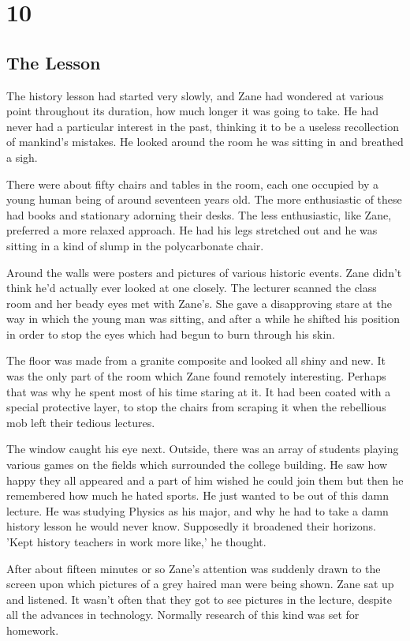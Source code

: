 \chapter{10}
\section{The Lesson}


The history lesson had started very slowly, and Zane had wondered at various point throughout its duration, how much longer it was going to take.  He had never had a particular interest in the past, thinking it to be a useless recollection of mankind's mistakes.   He looked around the room he was sitting in and breathed a sigh.

There were about fifty chairs and tables in the room, each one occupied by a young human being of around seventeen years old.  The more enthusiastic of these had books and stationary adorning their desks.  The less enthusiastic, like Zane, preferred a more relaxed approach.  He had his legs stretched out and he was sitting in a kind of slump in the polycarbonate chair.

Around the walls were posters and pictures of various historic events.  Zane didn't think he'd actually ever looked at one closely.  The lecturer scanned the class room and her beady eyes met with Zane's.  She gave a disapproving stare at the way in which the young man was sitting, and after a while he shifted his position in order to stop the eyes which had begun to burn through his skin.

The floor was made from a granite composite and looked all shiny and new.  It was the only part of the room which Zane found remotely interesting.  Perhaps that was why he spent most of his time staring at it.  It had been coated with a special protective layer, to stop the chairs from scraping it when the rebellious mob left their tedious lectures.

The window caught his eye next.  Outside, there was an array of students playing various games on the fields which surrounded the college building.  He saw how happy they all appeared and a part of him wished he could join them but then he remembered how much he hated sports.  He just wanted to be out of this damn lecture.  He was studying Physics as his major, and why he had to take a damn history lesson he would never know.  Supposedly it broadened their horizons.  'Kept history teachers in work more like,' he thought.

After about fifteen minutes or so Zane's attention was suddenly drawn to the screen upon which pictures of a grey haired man were being shown.  Zane sat up and listened.  It wasn't often that they got to see pictures in the lecture, despite all the advances in technology.  Normally research of this kind was set for homework.  

